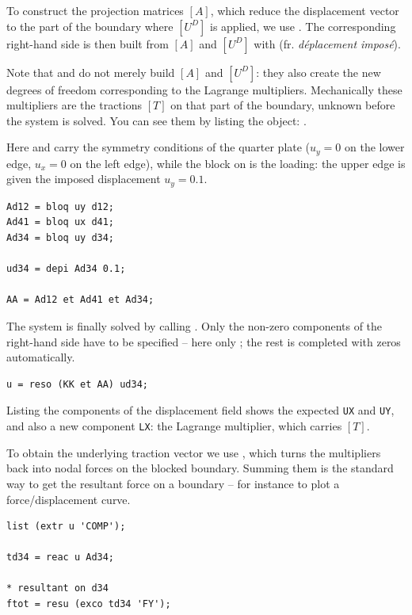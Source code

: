 \begin{castemcom}
To construct the projection matrices $[A]$, which reduce the displacement
vector to the part of the boundary where $[U^{D}]$ is applied, we use
 . The
corresponding right-hand side is then built from $[A]$ and $[U^{D}]$ with
  (fr. \emph{déplacement imposé}).

Note that  and  do not merely build $[A]$ and
$[U^{D}]$: they also create the new degrees of freedom corresponding to the
Lagrange multipliers. Mechanically these multipliers are the tractions $[T]$
on that part of the boundary, unknown before the system is solved. You can
see them by listing the object: .

Here  and  carry the symmetry conditions of the quarter
plate ($u_y=0$ on the lower edge, $u_x=0$ on the left edge), while the block
on  is the loading: the upper edge is given the imposed displacement
$u_y=0.1$.
\end{castemcom}
\begin{castemlines}
\begin{verbatim}
Ad12 = bloq uy d12;
Ad41 = bloq ux d41;
Ad34 = bloq uy d34;

ud34 = depi Ad34 0.1;

AA = Ad12 et Ad41 et Ad34;
\end{verbatim}
\end{castemlines}

\begin{castemcom}
The system is finally solved by calling 
. Only the non-zero components of the right-hand
side have to be specified -- here only ; the rest is completed with
zeros automatically.
\end{castemcom}
\begin{castemlines}
\begin{verbatim}
u = reso (KK et AA) ud34;
\end{verbatim}
\end{castemlines}

\begin{castemcom}
Listing the components of the displacement field shows the expected
\texttt{UX} and \texttt{UY}, and also a new component \texttt{LX}: the
Lagrange multiplier, which carries $[T]$.

To obtain the underlying traction vector we use 
, which turns the multipliers back into
nodal forces on the blocked boundary. Summing them is the standard way to get
the resultant force on a boundary -- for instance to plot a force/displacement
curve.
\end{castemcom}
\begin{castemlines}
\begin{verbatim}
list (extr u 'COMP');

td34 = reac u Ad34;

* resultant on d34
ftot = resu (exco td34 'FY');
\end{verbatim}
\end{castemlines}

